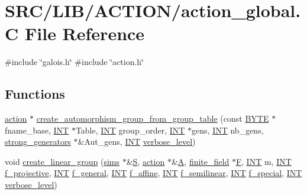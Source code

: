 \hypertarget{action__global_8_c}{}\section{S\+R\+C/\+L\+I\+B/\+A\+C\+T\+I\+O\+N/action\+\_\+global.C File Reference}
\label{action__global_8_c}
{\ttfamily \#include \char`\"{}galois.\+h\char`\"{}}\newline
{\ttfamily \#include \char`\"{}action.\+h\char`\"{}}\newline
\subsection*{Functions}
\begin{DoxyCompactItemize}
\item 
\mbox{\hyperlink{classaction}{action}} $\ast$ \mbox{\hyperlink{action__global_8_c_a26edd2b6827b6f73bd0d09a6afb6d55b}{create\+\_\+automorphism\+\_\+group\+\_\+from\+\_\+group\+\_\+table}} (const \mbox{\hyperlink{galois_8h_ab6cc7b4aeb6ea31aba2b3fbfc83ff5e6}{B\+Y\+TE}} $\ast$fname\+\_\+base, \mbox{\hyperlink{galois_8h_a09fddde158a3a20bd2dcadb609de11dc}{I\+NT}} $\ast$Table, \mbox{\hyperlink{galois_8h_a09fddde158a3a20bd2dcadb609de11dc}{I\+NT}} group\+\_\+order, \mbox{\hyperlink{galois_8h_a09fddde158a3a20bd2dcadb609de11dc}{I\+NT}} $\ast$gens, \mbox{\hyperlink{galois_8h_a09fddde158a3a20bd2dcadb609de11dc}{I\+NT}} nb\+\_\+gens, \mbox{\hyperlink{classstrong__generators}{strong\+\_\+generators}} $\ast$\&Aut\+\_\+gens, \mbox{\hyperlink{galois_8h_a09fddde158a3a20bd2dcadb609de11dc}{I\+NT}} \mbox{\hyperlink{simeon_8_c_a818073fbcc2f439e7c56952f67386122}{verbose\+\_\+level}})
\item 
void \mbox{\hyperlink{action__global_8_c_a0f8feabe739b53848853347a45964c25}{create\+\_\+linear\+\_\+group}} (\mbox{\hyperlink{classsims}{sims}} $\ast$\&\mbox{\hyperlink{simeon_8_c_adab47f8243f1b5a2c31df2535d6b37d0}{S}}, \mbox{\hyperlink{classaction}{action}} $\ast$\&\mbox{\hyperlink{simeon_8_c_a97833f04c3a9c008df5521a2fc291bb4}{A}}, \mbox{\hyperlink{classfinite__field}{finite\+\_\+field}} $\ast$\mbox{\hyperlink{simeon_8_c_a21a61c535ff7d9d4b674461d3b19fffa}{F}}, \mbox{\hyperlink{galois_8h_a09fddde158a3a20bd2dcadb609de11dc}{I\+NT}} m, \mbox{\hyperlink{galois_8h_a09fddde158a3a20bd2dcadb609de11dc}{I\+NT}} \mbox{\hyperlink{simeon_8_c_aa700953930747c9c9ec1202f5f746a23}{f\+\_\+projective}}, \mbox{\hyperlink{galois_8h_a09fddde158a3a20bd2dcadb609de11dc}{I\+NT}} \mbox{\hyperlink{simeon_8_c_acdff936645f55fa6d367c21b75128181}{f\+\_\+general}}, \mbox{\hyperlink{galois_8h_a09fddde158a3a20bd2dcadb609de11dc}{I\+NT}} \mbox{\hyperlink{simeon_8_c_af0d85ac2f9ec44c7401cbecbdc23a5a7}{f\+\_\+affine}}, \mbox{\hyperlink{galois_8h_a09fddde158a3a20bd2dcadb609de11dc}{I\+NT}} \mbox{\hyperlink{simeon_8_c_abe9d1351be10f92305ed7533cd3a3c08}{f\+\_\+semilinear}}, \mbox{\hyperlink{galois_8h_a09fddde158a3a20bd2dcadb609de11dc}{I\+NT}} \mbox{\hyperlink{simeon_8_c_a5c9bb19da4c942e41c1d5cfc81f4cfd7}{f\+\_\+special}}, \mbox{\hyperlink{galois_8h_a09fddde158a3a20bd2dcadb609de11dc}{I\+NT}} \mbox{\hyperlink{simeon_8_c_a818073fbcc2f439e7c56952f67386122}{verbose\+\_\+level}})

\end{DoxyCompactItemize}
